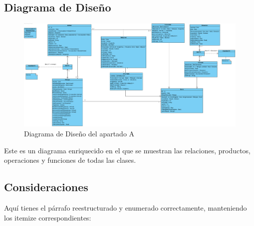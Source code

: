 \newpage
\subsection{Diagrama de Diseño}

\begin{figure}[H]
    \centering
     \includegraphics[width=1\linewidth]{assets/Diagrama_bien.png}
     \caption{Diagrama de Diseño del apartado A}
\end{figure}

Este es un diagrama enriquecido en el que se muestran las relaciones, productos, operaciones y funciones de todas las clases.

\subsection{Consideraciones}\label{page:Consideraciones}

Aquí tienes el párrafo reestructurado y enumerado correctamente, manteniendo los itemize correspondientes:

